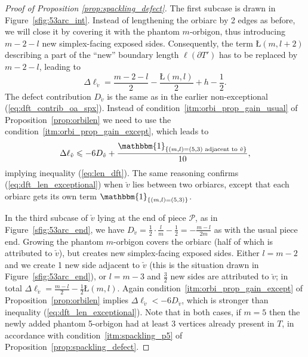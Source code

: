\documentclass{amsart}
\begin{document}
\begin{proof}[Proof of Proposition \ref{prop:spackling_defect}]
The first subcase is drawn in Figure~\ref{sfig:53arc_int}. Instead of lengthening the orbiarc by 2 edges as before, we will close it by covering it with the phantom $m$-orbigon, thus introducing $m-2-l$ new simplex-facing exposed sides. Consequently, the term $Ł(m,l+2)$ describing a part of the ``new'' boundary length $\ell(\partial T')$ has to be replaced by $m-2-l$, leading to
\begin{equation*}
\Delta\ell_{\check{v}}=\frac{m-2-l}{2}-\frac{Ł(m,l)}{2}+h-\frac{1}{2}.
\end{equation*}
The defect contribution $D_{\check{v}}$ is the same as in the earlier non-exceptional (\ref{eq:dft_contrib_oa_spx}). Instead of condition~\ref*{itm:orbi_prop_gain_usual} of Proposition~\ref{prop:orbilen} we need to use the condition~\ref*{itm:orbi_prop_gain_except}, which leads to
\begin{equation}\label{eq:dft_len_exceptional}
\Delta\ell_{\check{v}}\leqslant-6D_{\check{v}}+\frac{\mathbbm{1}_{\{(m,l)=(5,3)\text{ adjacent to }\check{v}\}}}{10},
\end{equation}
implying inequality (\ref{eq:len_dft}). The same reasoning confirms (\ref{eq:dft_len_exceptional}) when $\check{v}$ lies between two orbiarcs, except that each orbiarc gets its own term $\mathbbm{1}_{\{(m,l)=(5,3)\}}$.

In the third subcase of $\check{v}$ lying at the end of piece $\mathcal{P}$, as in Figure~\ref{sfig:53arc_end}, we have $D_{\check{v}}=\tfrac{1}{2}\cdot\frac{l}{m}-\tfrac{1}{2}=-\tfrac{m-l}{2m}$ as with the usual piece end. Growing the phantom $m$-orbigon covers the orbiarc (half of which is attributed to $\check{v}$), but creates new simplex-facing exposed sides. Either $l=m-2$ and we create 1 new side adjacent to $\check{v}$ (this is the situation drawn in Figure~\ref{sfig:53arc_end}), or $l=m-3$ and $\tfrac{3}{2}$ new sides are attributed to $\check{v}$; in total $\Delta\ell_{\check{v}}=\tfrac{m-l}{2}-\tfrac{1}{2}Ł(m,l)$. Again condition~\ref*{itm:orbi_prop_gain_except} of Proposition~\ref{prop:orbilen} implies $\Delta\ell_{\check{v}}<-6D_{\check{v}}$, which is stronger than inequality (\ref{eq:dft_len_exceptional}). Note that in both cases, if $m=5$ then the newly added phantom 5-orbigon had at least 3 vertices already present in $T$, in accordance with condition~\ref*{itm:spackling_p5} of Proposition~\ref{prop:spackling_defect}.


\end{proof}
\end{document}
